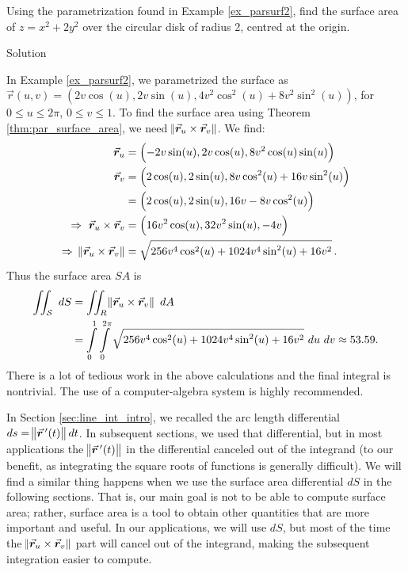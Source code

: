 \begin{example}
\label{ex_parsurfarea1}Using the parametrization found in Example \ref{ex_parsurf2}, find the surface area of $z=x^2+2y^2$ over the circular disk of radius 2, centred at the origin.

Solution 

In Example \ref{ex_parsurf2}, we parametrized the surface as \\ $\vec r(u,v) = \left( 2v\cos (u), 2v\sin (u), 4v^2\cos^2(u)+8v^2\sin^2(u)\right)$, for $0\leq u\leq 2\pi$, $0\leq v\leq 1$. To find the surface area using Theorem \ref{thm:par_surface_area}, we need $\norm{\vec r_u\times\vec r_v}$. We find:
\begin{align*}
\vec r_u &= \left( -2v\sin (u), 2v\cos (u), 8v^2\cos (u)\sin (u)\right)\\
\vec r_v &= \left( 2\cos (u), 2\sin (u), 8v\cos^2 (u)+16v\sin^2(u)\right)\\
&= \left( 2\cos (u), 2\sin (u), 16v -8v\cos^2 (u)\right)\\
\Rightarrow \ \vec r_u\times\vec r_v &= \left( 16v^2\cos (u), 32v^2\sin (u), -4v\right)\\
\Rightarrow \ \norm{\vec r_u\times\vec r_v} &= \sqrt{256v^4\cos^2(u)+1024v^4\sin^2(u)+16v^2}\, .
\end{align*}
Thus the surface area $SA$ is
\begin{align*}
\iint_\surfaceS \ dS &= \iint_R\norm{\vec r_u\times \vec r_v}\ dA \\
& = \int\limits_0^1\int\limits_0^{2\pi} \sqrt{256v^4\cos^2(u)+1024v^4\sin^2(u)+16v^2}\ du\ dv \approx 53.59.
\end{align*}
There is a lot of tedious work in the above calculations and the final integral is nontrivial. The use of a computer-algebra system is highly recommended.
\end{example}

In Section \ref{sec:line_int_intro}, we recalled the arc length differential $ds=\norm{\vrp(t)}dt$. In subsequent sections, we used that differential, but in most applications the $\norm{\vrp(t)}$ in the differential canceled out of the integrand (to our benefit, as integrating the square roots of functions is generally difficult). We will find a similar thing happens when we use the surface area differential $dS$ in the following sections. That is, our main goal is not to be able to compute surface area; rather, surface area is a tool to obtain other quantities that are more important and useful. In our applications, we will use $dS$, but most of the time the $\norm{\vec r_u\times \vec r_v}$ part will cancel out of the integrand, making the subsequent integration easier to compute.


